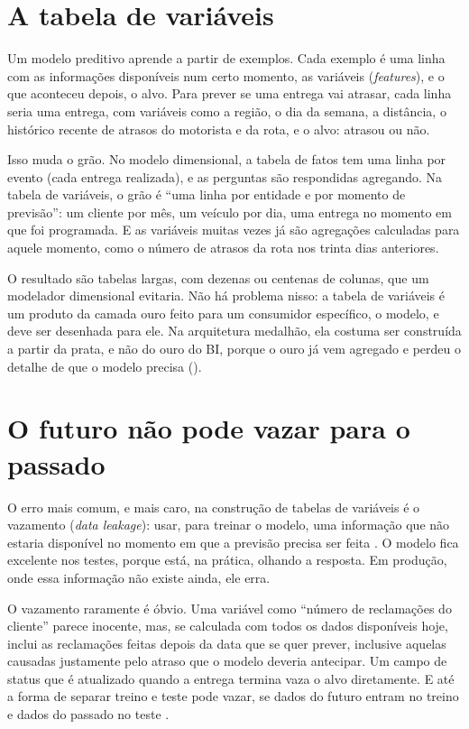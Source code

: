 \section{A tabela de variáveis}
\label{sec:tabela-features}

Um modelo preditivo aprende a partir de exemplos. Cada exemplo é uma linha com as
informações disponíveis num certo momento, as variáveis (\emph{features}), e o que aconteceu
depois, o alvo. Para prever se uma entrega vai atrasar, cada linha seria uma entrega, com
variáveis como a região, o dia da semana, a distância, o histórico recente de atrasos do
motorista e da rota, e o alvo: atrasou ou não.

Isso muda o grão. No modelo dimensional, a tabela de fatos tem uma linha por evento (cada
entrega realizada), e as perguntas são respondidas agregando. Na tabela de variáveis, o grão
é \enquote{uma linha por entidade e por momento de previsão}: um cliente por mês, um veículo
por dia, uma entrega no momento em que foi programada. E as variáveis muitas vezes já são
agregações calculadas para aquele momento, como o número de atrasos da rota nos trinta dias
anteriores.

O resultado são tabelas largas, com dezenas ou centenas de colunas, que um modelador
dimensional evitaria. Não há problema nisso: a tabela de variáveis é um produto da camada
ouro feito para um consumidor específico, o modelo, e deve ser desenhada para ele. Na
arquitetura medalhão, ela costuma ser construída a partir da prata, e não do ouro do BI,
porque o ouro já vem agregado e perdeu o detalhe de que o modelo precisa
().

\section{O futuro não pode vazar para o passado}
\label{sec:vazamento}

O erro mais comum, e mais caro, na construção de tabelas de variáveis é o vazamento
(\emph{data leakage}): usar, para treinar o modelo, uma informação que não estaria disponível
no momento em que a previsão precisa ser feita \parencite{kaufman2012}. O modelo fica
excelente nos testes, porque está, na prática, olhando a resposta. Em produção, onde essa
informação não existe ainda, ele erra.

O vazamento raramente é óbvio. Uma variável como \enquote{número de reclamações do cliente}
parece inocente, mas, se calculada com todos os dados disponíveis hoje, inclui as
reclamações feitas depois da data que se quer prever, inclusive aquelas causadas justamente
pelo atraso que o modelo deveria antecipar. Um campo de status que é atualizado quando a
entrega termina vaza o alvo diretamente. E até a forma de separar treino e teste pode vazar,
se dados do futuro entram no treino e dados do passado no teste \parencite{huyen2022}.

